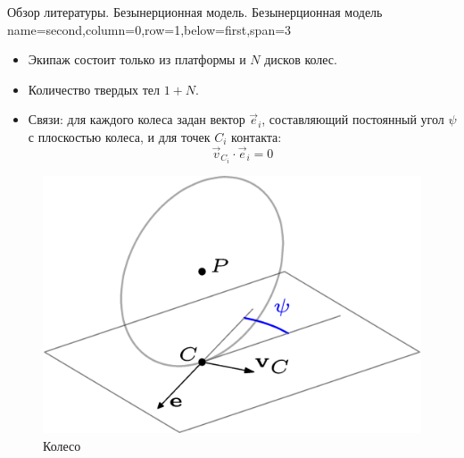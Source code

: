 \begin{myposter}{
    Обзор литературы. Безынерционная модель.
}
    \headerbox
    {Безынерционная модель}
    {name=second,column=0,row=1,below=first,span=3}
    {
        \vspace{10pt}
        {\huge\bf
            \begin{itemize}
                \item {
                    Экипаж состоит только из платформы и $N$ дисков колес.
                }
                \item {
                    Количество твердых тел $1 + N$.
                }
                \item {
                    Связи: для каждого колеса задан вектор $\vec{e}_i$, составляющий постоянный угол $\psi$ с плоскостью колеса, и для точек $C_i$ контакта:
                    \vspace{-15pt}
                    $$\vec{v}_{C_i} \cdot \vec{e}_i = 0$$
                }
            \end{itemize}
            \vspace{-10pt}
            \begin{figure}[H]
                \centering
                    \centering
                    \includegraphics[width=\textwidth]{content/pic/asypng/wheel_bor.png}
                    \caption{Колесо}
                    \label{fig:bor_wheel_scheme}
                \endminipage
                    \centering

\end{figure}}}
\end{myposter}
